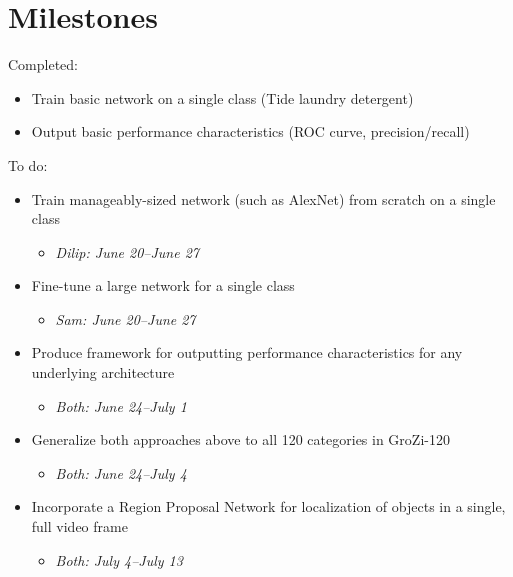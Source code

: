 \documentclass{article}
\begin{document}
\section{Milestones}

Completed:

\begin{itemize}

	\item Train basic network on a single class (Tide laundry detergent)

	\item Output basic performance characteristics (ROC curve, precision/recall)

\end{itemize}

To do:

\begin{itemize}

	\item Train manageably-sized network (such as AlexNet) from scratch on a single class
	\begin{itemize}
		\item \textit{Dilip: June 20--June 27}
	\end{itemize}

	\item Fine-tune a large network for a single class
	\begin{itemize}
		\item \textit{Sam: June 20--June 27}
	\end{itemize}

	\item Produce framework for outputting performance characteristics for any underlying architecture
	\begin{itemize}
		\item \textit{Both: June 24--July 1}
	\end{itemize}

	\item Generalize both approaches above to all 120 categories in GroZi-120
	\begin{itemize}
		\item \textit{Both: June 24--July 4}
	\end{itemize}

	\item Incorporate a Region Proposal Network for localization of objects in a single, full video frame
	\begin{itemize}
		\item \textit{Both: July 4--July 13}
	\end{itemize}


\end{itemize}
\end{document}
